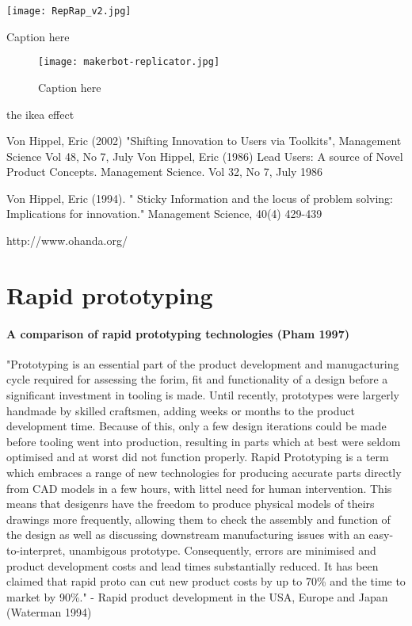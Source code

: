 \begin{NFfigure}
    \begin{center}
        \texttt{[image: RepRap\_v2.jpg]}
    \end{center}
    \caption{Caption here}
    \label{fig:RepRap_v2}
\end{NFfigure}




\begin{figure}[]
    \begin{center}
        \texttt{[image: makerbot-replicator.jpg]}
    \end{center}
    \caption{Caption here}
    \label{fig:makerbot-replicator}
\end{figure}

the ikea effect

Von Hippel, Eric (2002) "Shifting Innovation to Users via Toolkits", Management Science Vol 48, No 7, July
 Von Hippel, Eric (1986) Lead Users: A source of Novel Product Concepts.
 Management Science.
 Vol 32, No 7,
July 1986

Von Hippel, Eric (1994).
" Sticky Information and the locus of problem solving: Implications for innovation."
Management Science, 40(4) 429-439

http://www.ohanda.org/


\section{Rapid prototyping} %

\paragraph{A comparison of rapid prototyping technologies (Pham 1997)}

"Prototyping is an essential part of the product development and manugacturing cycle required for assessing the forim, fit and functionality of a design before a significant investment in tooling is made.
Until recently, prototypes were largerly handmade by skilled craftsmen, adding weeks or months to the product development time.
Because of this, only a few design iterations could be made before tooling went into production, resulting in parts which at best were seldom optimised and at worst did not function properly.
Rapid Prototyping is a term which embraces a range of new technologies for producing accurate parts directly from CAD models in a few hours, with littel need for human intervention.
This means that desigenrs have the freedom to produce physical models of theirs drawings more frequently, allowing them to check the assembly and function of the design as well as discussing downstream manufacturing issues with an easy-to-interpret, unambigous prototype.
Consequently, errors are minimised and product development costs and lead times substantially reduced.
It has been claimed that rapid proto can cut new product costs by up to 70\% and the time to market by 90\%."
- Rapid product development in the USA, Europe and Japan (Waterman 1994)


